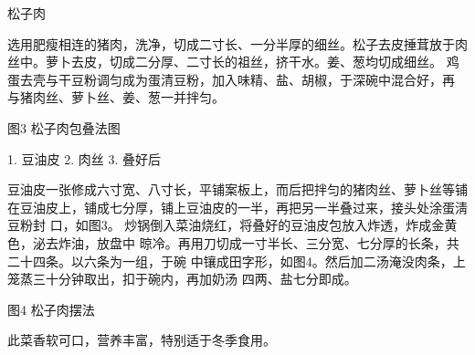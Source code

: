 \begin{recipe}{松子肉}

\ingredients


\cooking

\step 选用肥瘦相连的猪肉，洗净，切成二寸长、一分半厚的细丝。松子去皮捶茸放于肉
丝中。萝卜去皮，切成二分厚、二寸长的祖丝，挤干水。姜、葱均切成细丝。
\step 鸡蛋去壳与干豆粉调匀成为蛋清豆粉，加入味精、盐、胡椒，于深碗中混合好，再
与猪肉丝、萝卜丝、姜、葱一并拌匀。

图3 松子肉包叠法图

1. 豆油皮 2. 肉丝 3. 叠好后

\step 豆油皮一张修成六寸宽、八寸长，平铺案板上，而后把拌匀的猪肉丝、萝卜丝等铺
在豆油皮上，铺成七分厚，铺上豆油皮的一半，再把另一半叠过来，接头处涂蛋淸豆粉封
口，如图3。
\step 炒锅倒入菜油烧红，将叠好的豆油皮包放入炸透，炸成金黄色，泌去炸油，放盘中
晾冷。再用刀切成一寸半长、三分宽、七分厚的长条，共二十四条。以六条为一组，于碗
中镶成田字形，如图4。然后加二汤淹没肉条，上笼蒸三十分钟取出，扣于碗内，再加奶汤
四两、盐七分即成。

图4 松子肉摆法

\notes

此菜香软可口，营养丰富，特别适于冬季食用。

\end{recipe}

